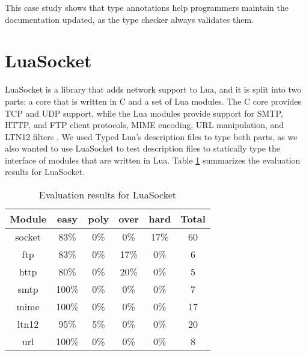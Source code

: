 This case study shows that type annotations help programmers maintain the
documentation updated, as the type checker always validates them.

\section{LuaSocket}

LuaSocket is a library that adds network support to Lua,
and it is split into two parts: a core that is written in C and a set of
Lua modules.
The C core provides TCP and UDP support, while the Lua modules provide
support for SMTP, HTTP, and FTP client protocols, MIME encoding,
URL manipulation, and LTN12 filters \citep{nehab2008ltn012}.
We used Typed Lua's description files to type both parts, as we also
wanted to use LuaSocket to test description files to statically type
the interface of modules that are written in Lua.
Table \ref{tab:evalsocket} summarizes the evaluation results for LuaSocket.

\begin{table}[!ht]
\begin{center}
\begin{tabular}{|c|c|c|c|c|c|}
\hline
\textbf{Module} & \textbf{easy} & \textbf{poly} & \textbf{over} & \textbf{hard} & \textbf{Total} \\
\hline
socket & 83\% & 0\% & 0\% & 17\% & 60 \\ %
\hline
ftp & 83\% & 0\% & 17\% & 0\% & 6 \\ %
\hline
http & 80\% & 0\% & 20\% & 0\% & 5 \\ %
\hline
smtp & 100\% & 0\% & 0\% & 0\% & 7 \\ %
\hline
mime & 100\% & 0\% & 0\% & 0\% & 17 \\ %
\hline
ltn12 & 95\% & 5\% & 0\% & 0\% & 20 \\ %
\hline
url & 100\% & 0\% & 0\% & 0\% & 8 \\ %
\hline
\end{tabular}
\end{center}
\caption{Evaluation results for LuaSocket}
\label{tab:evalsocket}
\end{table}

